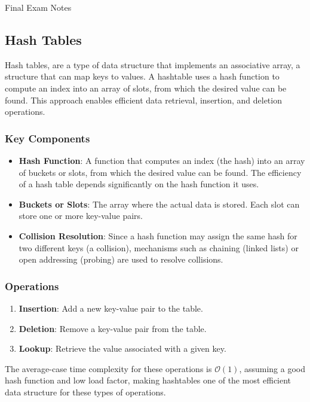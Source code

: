 \begin{examnotes}{Final Exam Notes}
    \subsection*{Hash Tables}

    Hash tables, are a type of data structure that implements an associative array, a structure that can map keys to values. A hashtable uses a hash function to compute an index into an array of slots, 
    from which the desired value can be found. This approach enables efficient data retrieval, insertion, and deletion operations.
    
    \subsubsection*{Key Components}
    
    \begin{itemize}
        \item \textbf{Hash Function}: A function that computes an index (the hash) into an array of buckets or slots, from which the desired value can be found. The efficiency of a hash table depends 
        significantly on the hash function it uses.
        \item \textbf{Buckets or Slots}: The array where the actual data is stored. Each slot can store one or more key-value pairs.
        \item \textbf{Collision Resolution}: Since a hash function may assign the same hash for two different keys (a collision), mechanisms such as chaining (linked lists) or open addressing (probing) 
        are used to resolve collisions.
    \end{itemize}
    
    \subsubsection*{Operations}
    
    \begin{enumerate}
        \item \textbf{Insertion}: Add a new key-value pair to the table.
        \item \textbf{Deletion}: Remove a key-value pair from the table.
        \item \textbf{Lookup}: Retrieve the value associated with a given key.
    \end{enumerate}
    
    The average-case time complexity for these operations is $\mathcal{O}(1)$, assuming a good hash function and low load factor, making hashtables one of the most efficient data structure for these 
    types of operations.


\end{examnotes}
